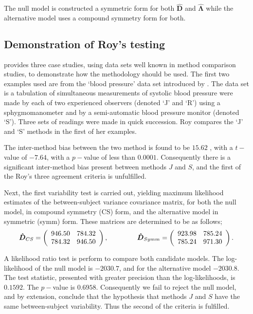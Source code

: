 \documentclass[12pt, a4paper]{report}
\theoremstyle{plain}
\theoremstyle{definition}
\theoremstyle{remark}
\begin{document}
			The null model is constructed a symmetric form for both $\boldsymbol{\hat{D}}$ and $\boldsymbol{\hat{\Lambda}}$ while the alternative model uses a compound symmetry form for both.
			
	\subsection{Demonstration of Roy's testing}
\citet{ARoy2009} provides three case studies, using data sets well known in method comparison studies, to demonstrate how the methodology should be used. The first two examples used are from the `blood pressure' data set introduced by \citet{BA99}. The data set is a tabulation of simultaneous measurements of systolic blood pressure were made by each of two experienced observers (denoted `J' and `R') using a sphygmomanometer and by a semi-automatic blood pressure monitor (denoted `S'). Three sets of readings were made in quick succession. Roy compares the `J' and `S' methods in the first of her examples.
	
	The inter-method bias between the two method is found to be $15.62$ , with a $t-$value of $-7.64$, with a $p-$value of less than $0.0001$. Consequently there is a significant inter-method bias present between methods $J$ and $S$, and the first of the Roy's three agreement criteria is unfulfilled.
	
	Next, the first variability test is carried out, yielding maximum likelihood estimates of the between-subject variance covariance matrix, for both the null model, in compound symmetry (CS) form, and the alternative model in symmetric (symm) form. These matrices are determined to be as follows;
	\[
	\boldsymbol{\hat{D}}_{CS} = \left( \begin{array}{cc}
	946.50 & 784.32  \\
	784.32 & 946.50  \\
	\end{array}\right),
	\hspace{1.5cm}
	\boldsymbol{\hat{D}}_{Symm} = \left( \begin{array}{cc}
	923.98 & 785.24  \\
	785.24 & 971.30  \\
	\end{array}\right).
	\]
	
	A likelihood ratio test is perform to compare both candidate models. The log-likelihood of the null model is $-2030.7$, and for the alternative model $-2030.8$. The test statistic, presented with greater precision than the log-likelihoods, is $0.1592$. The $p-$value is $0.6958$. Consequently we fail to reject the null model, and by extension, conclude that the hypothesis that methods $J$ and $S$ have the same between-subject variability. Thus the second of the criteria is fulfilled.
	
\end{document}
